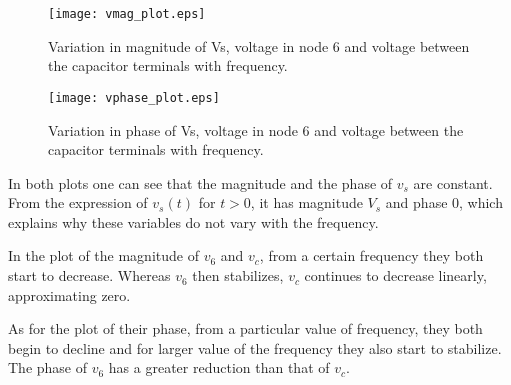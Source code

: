 \begin{figure}[H] \centering
\texttt{[image: vmag\_plot.eps]}
\caption{Variation in magnitude of Vs, voltage in node 6 and voltage between the capacitor terminals with frequency.}
\label{fig:magnitude}
\end{figure}


\begin{figure}[H] \centering
\texttt{[image: vphase\_plot.eps]}
\caption{Variation in phase of Vs, voltage in node 6 and voltage between the capacitor terminals with frequency.}
\label{fig:phase}
\end{figure}

In both plots one can see that the magnitude and the phase of $v_s$ are constant. From the expression of $v_s(t)$ for $t>0$, it has magnitude $V_s$ and phase $0$, which explains why these variables do not vary with the frequency.
\par
In the plot of the magnitude of $v_6$ and $v_c$, from a certain frequency they both start to decrease. Whereas $v_6$ then stabilizes, $v_c$ continues to decrease linearly, approximating zero.
\par
As for the plot of their phase, from a particular value of frequency, they both begin to decline and for larger value of the frequency they also start to stabilize. The phase of $v_6$ has a greater reduction than that of $v_c$.





